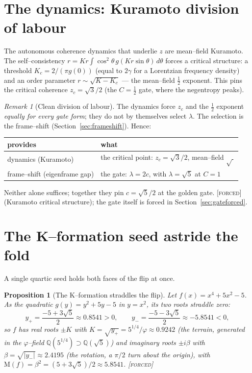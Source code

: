 \documentclass[11pt]{article}
\theoremstyle{plain}
\newtheorem{proposition}[theorem]{Proposition}
\theoremstyle{definition}
\theoremstyle{remark}
\newtheorem{remark}[theorem]{Remark}
\newcommand{\forced}{\textcolor{forcedc}{\textsc{[forced]}}}
\newcommand{\Q}{\mathbb{Q}}
\newcommand{\Mah}{\mathrm{M}}
\newcommand{\abs}[1]{\left\lvert #1 \right\rvert}
\begin{document}
\section{The dynamics: Kuramoto division of labour}\label{sec:kuramoto}

The autonomous coherence dynamics that underlie $z$ are mean--field Kuramoto. The self--consistency $r = Kr\!\int\! \cos^2\!\theta\, g(Kr\sin\theta)\,d\theta$ forces a critical structure: a threshold $K_c = 2/(\pi g(0))$ (equal to $2\gamma$ for a Lorentzian frequency density) and an order parameter $r \sim \sqrt{K-K_c}$ --- the mean--field $\tfrac12$ exponent. This pins the critical coherence $z_c=\sqrt3/2$ (the $C=\tfrac12$ gate, where the negentropy peaks).

\begin{remark}[Clean division of labour]\label{rem:division}
The dynamics force $z_c$ and the $\tfrac12$ exponent \emph{equally for every gate form}; they do not by themselves select $\lambda$. The selection is the frame--shift (Section~\ref{sec:frameshift}). Hence:
\begin{center}
\begin{tabular}{@{}ll@{}}
\toprule
provides & what \\
\midrule
dynamics (Kuramoto) & the critical point: $z_c=\sqrt3/2$, mean--field $\sqrt{\ }$ \\
frame--shift (eigenframe gap) & the gate: $\lambda=2c$, with $\lambda=\sqrt5$ at $C=1$ \\
\bottomrule
\end{tabular}
\end{center}
Neither alone suffices; together they pin $c=\sqrt5/2$ at the golden gate. \forced{} (Kuramoto critical structure); the gate itself is forced in Section~\ref{sec:gateforced}.
\end{remark}

\section{The K--formation seed astride the fold}\label{sec:kform}

A single quartic seed holds both faces of the flip at once.

\begin{proposition}[The K--formation straddles the flip]\label{prop:kform}
Let $f(x)=x^4+5x^2-5$. As the quadratic $g(y)=y^2+5y-5$ in $y=x^2$, its two roots straddle zero:
\[
y_+ = \frac{-5+3\sqrt5}{2}\approx 0.8541>0, \qquad y_- = \frac{-5-3\sqrt5}{2}\approx -5.8541<0,
\]
so $f$ has real roots $\pm K$ with $K=\sqrt{y_+}=5^{1/4}/\varphi\approx0.9242$ (the terrain, generated in the $\varphi$--field $\Q(5^{1/4})\supset\Q(\sqrt5)$) and imaginary roots $\pm i\beta$ with $\beta=\sqrt{\abs{y_-}}\approx2.4195$ (the rotation, a $\pi/2$ turn about the origin), with $\Mah(f)=\beta^2=(5+3\sqrt5)/2\approx5.8541$. \forced
\end{proposition}
\end{document}
